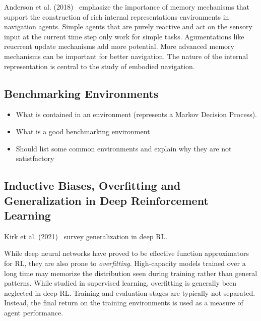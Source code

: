 Anderson et al. (2018)~\cite{anderson_evaluation_2018} emphasize the importance of memory mechanisms that support the construction of rich internal representations environments in navigation agents.
Simple agents that are purely reactive and act on the sensory input at the current time step only work for simple tasks.
Agumentations like reucrrent update mechanisms add more potential.
More advanced memory mechanisms can be important for better navigation.
The nature of the internal representation is central to the study of embodied navigation.
% 


\subsection{Benchmarking Environments}

\begin{itemize}
    \item What is contained in an environment (represents a Markov Decision Process).
    \item What is a good benchmarking environment
    \item Should list some common environments and explain why they are not satistfactory
\end{itemize}

\subsection{Inductive Biases, Overfitting and Generalization in Deep Reinforcement Learning}


Kirk et al. (2021)~\cite{kirk_survey_2022} survey generalization in deep RL.


While deep neural networks have proved to be effective function approximators for RL, they are also prone to \textit{overfitting}.
High-capacity models trained over a long time may memorize the distribution seen during training rather than general patterns.
While studied in supervised learning, overfitting is generally been neglected in deep RL.
Training and evaluation stages are typically not separated.
Instead, the final return on the training environments is used as a measure of agent performance.

